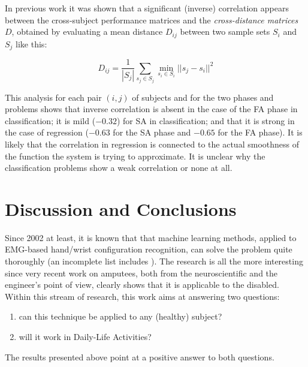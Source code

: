 \documentclass[10pt]{bmc_article}
\newenvironment{bmcformat}
  {\begin{raggedright}\baselineskip20pt\sloppy\setboolean{publ}{false}}
  {\end{raggedright}\baselineskip20pt\sloppy}
\begin{document}
\begin{bmcformat}
In previous work it was shown that a significant (inverse) correlation
appears between the cross-subject performance matrices and the
\emph{cross-distance matrices} $D$,
obtained by evaluating a mean distance $D_{ij}$ between
two sample sets $S_i$ and $S_j$ like this:

$$ D_{ij} = \frac{1}{|S_j|} \sum_{s_j \in S_j}{\min_{s_i \in S_i}{ ||s_j-s_i||^2 } } $$

This analysis for each pair $(i,j)$ of subjects and for
the two phases and problems shows that inverse correlation
is absent in the case of the FA phase in classification; it is mild
($-0.32$) for SA in classification; and that it is strong in the case
of regression ($-0.63$ for the SA phase and $-0.65$ for the FA
phase). It is likely that the correlation in regression is connected
to the actual smoothness of the function the system is trying to
approximate. It is unclear why the classification problems show a
weak correlation or none at all.

\section*{Discussion and Conclusions}
\label{sec:discussion}

Since 2002 at least, it is known that that machine learning methods,
applied to EMG-based hand/wrist configuration recognition, can solve
the problem quite thoroughly (an incomplete list includes
\cite{chan2005,tsukamoto,englehart08,cipriani,2008.BioCyb}). The
research is all the more interesting since very recent work on
amputees, both from the neuroscientific \cite{sirigu1,sirigu2}
and the engineer's \cite{sebelius,2009.JPP,ramos}
point of view, clearly shows that it is applicable to the disabled.
Within this stream of research, this work aims at answering two questions:

\begin{enumerate}

  \item can this technique be applied to any (healthy) subject?

  \item will it work in Daily-Life Activities?

\end{enumerate}

The results presented above point at a positive answer to both questions.


\end{bmcformat}
\end{document}
